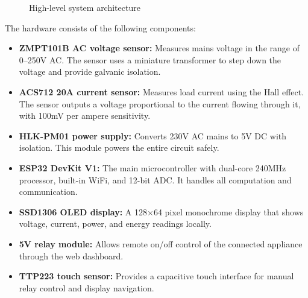 \documentclass[12pt, a4paper]{article}
\begin{document}
	\begin{figure}[H]
		\centering
		\caption{High-level system architecture}
		\label{fig:system-overview}
	\end{figure}
	
	The hardware consists of the following components:
	
	\begin{itemize}[itemsep=2pt, topsep=6pt]
		\item \textbf{ZMPT101B AC voltage sensor:} Measures mains voltage in the range of 0--250V AC. The sensor uses a miniature transformer to step down the voltage and provide galvanic isolation.
		
		\item \textbf{ACS712 20A current sensor:} Measures load current using the Hall effect. The sensor outputs a voltage proportional to the current flowing through it, with 100mV per ampere sensitivity.
		
		\item \textbf{HLK-PM01 power supply:} Converts 230V AC mains to 5V DC with isolation. This module powers the entire circuit safely.
		
		\item \textbf{ESP32 DevKit V1:} The main microcontroller with dual-core 240MHz processor, built-in WiFi, and 12-bit ADC. It handles all computation and communication.
		
		\item \textbf{SSD1306 OLED display:} A 128$\times$64 pixel monochrome display that shows voltage, current, power, and energy readings locally.
		
		\item \textbf{5V relay module:} Allows remote on/off control of the connected appliance through the web dashboard.
		
		\item \textbf{TTP223 touch sensor:} Provides a capacitive touch interface for manual relay control and display navigation.
	\end{itemize}
	
\end{document}
